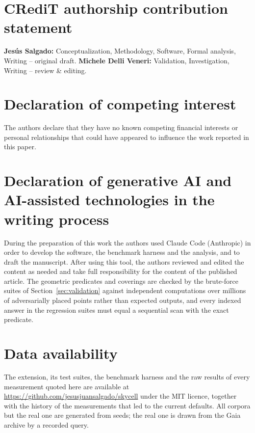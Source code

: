 \documentclass[preprint,12pt]{elsarticle}
\begin{document}
\section*{CRediT authorship contribution statement}

\textbf{Jes\'us Salgado:} Conceptualization, Methodology, Software, Formal analysis,
Writing -- original draft. \textbf{Michele Delli Veneri:} Validation, Investigation,
Writing -- review \& editing.

\section*{Declaration of competing interest}

The authors declare that they have no known competing financial interests or personal
relationships that could have appeared to influence the work reported in this paper.

\section*{Declaration of generative AI and AI-assisted technologies in the writing process}

During the preparation of this work the authors used Claude Code (Anthropic) in order to
develop the software, the benchmark harness and the analysis, and to draft the
manuscript. After using this tool, the authors reviewed and edited the content as needed
and take full responsibility for the content of the published article. The geometric
predicates and coverings are checked by the brute-force suites of
Section~\ref{sec:validation} against independent computations over millions of
adversarially placed points rather than expected outputs, and every indexed answer in the
regression suites must equal a sequential scan with the exact predicate.

\section*{Data availability}

The extension, its test suites, the benchmark harness and the raw results of every
measurement quoted here are available at
\url{https://github.com/jesusjuansalgado/skycell} under the MIT licence, together with
the history of the measurements that led to the current defaults. All corpora but the
real one are generated from seeds; the real one is drawn from the Gaia archive by a
recorded query.
\end{document}
